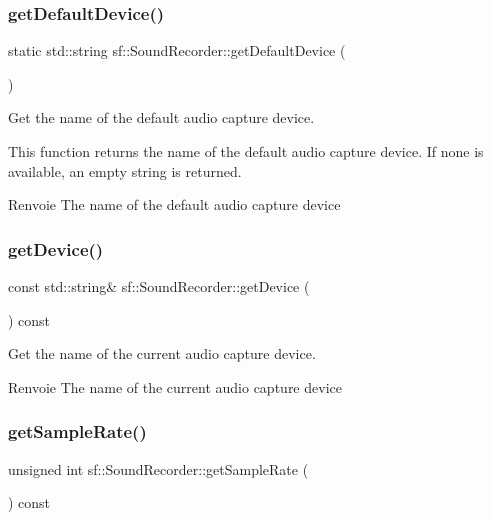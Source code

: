 \subsubsection{\texorpdfstring{get\+Default\+Device()}{getDefaultDevice()}}
{\footnotesize\ttfamily static std\+::string sf\+::\+Sound\+Recorder\+::get\+Default\+Device (\begin{DoxyParamCaption}{ }\end{DoxyParamCaption})\hspace{0.3cm}{\ttfamily [static]}}



Get the name of the default audio capture device. 

This function returns the name of the default audio capture device. If none is available, an empty string is returned.

\begin{DoxyReturn}{Renvoie}
The name of the default audio capture device 
\end{DoxyReturn}
\mbox{\label{classsf_1_1SoundRecorder_ab16cd53c6884cbf3380c017cee72ba81}} 
\subsubsection{\texorpdfstring{get\+Device()}{getDevice()}}
{\footnotesize\ttfamily const std\+::string\& sf\+::\+Sound\+Recorder\+::get\+Device (\begin{DoxyParamCaption}{ }\end{DoxyParamCaption}) const}



Get the name of the current audio capture device. 

\begin{DoxyReturn}{Renvoie}
The name of the current audio capture device 
\end{DoxyReturn}
\mbox{\label{classsf_1_1SoundRecorder_aed292c297a3e0d627db4eb5c18f58c44}} 
\subsubsection{\texorpdfstring{get\+Sample\+Rate()}{getSampleRate()}}
{\footnotesize\ttfamily unsigned int sf\+::\+Sound\+Recorder\+::get\+Sample\+Rate (\begin{DoxyParamCaption}{ }\end{DoxyParamCaption}) const}



